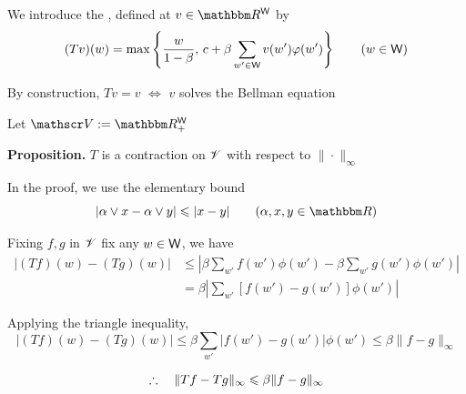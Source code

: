 \begin{frame}

    We introduce the , defined at
    $v \in \RR^\Wsf$ by
    \begin{equation*}
        (Tv)(w) 
        = 
        \max 
        \left\{
            \frac{w}{1-\beta}
            ,\,
            c + \beta \sum_{w' \in \mathsf W} v(w') \varphi(w')
        \right\}
        \qquad (w \in \mathsf W)
    \end{equation*}

    By construction, $Tv=v$ $\iff$ $v$ solves the Bellman equation 

        \vspace{0.5em}
    Let $\vV := \RR^\Wsf_+$ 

        \vspace{0.5em}
    {\bf Proposition.} $T$ is a contraction on $\mathscr V$
        with respect to $\| \cdot \|_\infty$

        \vspace{0.5em}
    In the proof, we use the elementary bound
    \begin{equation*}
        |\alpha \vee x - \alpha \vee y| \leq |x - y|
        \qquad (\alpha, x, y \in \RR)
    \end{equation*}

\end{frame}


\begin{frame}
    
    Fixing $f, g$ in $\mathscr V$ fix any $w \in \mathsf W$, we have 
    \begin{align*}
        |(Tf)(w) - (Tg)(w)|
        & \leq \left|
        \beta \sum_{w'} f(w') \phi(w')
                -
                \beta \sum_{w'} g(w') \phi(w')  
            \right|
        \\
        & = \beta 
            \left|
            \sum_{w'} [f(w') - g(w')] \phi(w') 
            \right|
    \end{align*}

    Applying the triangle inequality,
    \begin{equation*}
        |(Tf)(w) - (Tg)(w)|
        \leq \beta \sum_{w'} |f(w') - g(w')| \phi(w') 
        \leq \beta \| f - g \|_\infty 
    \end{equation*}

    \begin{equation*}
        \therefore \quad
        \|Tf - Tg \|_\infty \leqslant \beta \| f - g \|_\infty 
    \end{equation*}

\end{frame}



